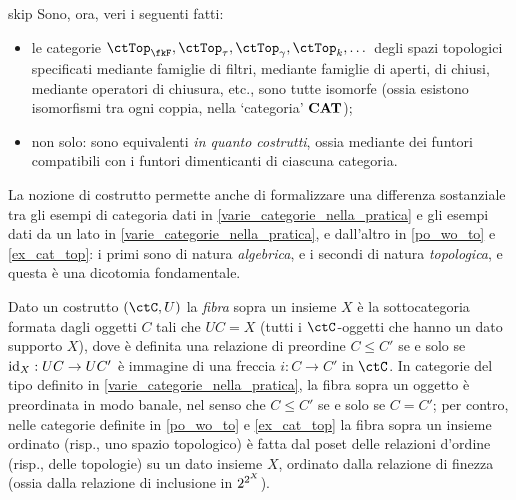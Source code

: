 \begin{hDigression}{skip}
	Sono, ora, veri i seguenti fatti:
	\begin{itemize}
		\item le categorie \(\ctTop_\fkF,\ctTop_\tau,\ctTop_\gamma,\ctTop_k,\dots\) degli spazi topologici specificati mediante famiglie di filtri, mediante famiglie di aperti, di chiusi, mediante operatori di chiusura, etc., sono tutte isomorfe (ossia esistono isomorfismi tra ogni coppia, nella `categoria' \(\mathbf{CAT}\));
		\item non solo: sono equivalenti \emph{in quanto costrutti}, ossia mediante dei funtori compatibili con i funtori dimenticanti di ciascuna categoria.
	\end{itemize}
	La nozione di costrutto permette anche di formalizzare una differenza sostanziale tra gli esempi di categoria dati in \ref{varie_categorie_nella_pratica} e gli esempi dati da un lato in \ref{varie_categorie_nella_pratica}, e dall'altro in \ref{po_wo_to} e \ref{ex_cat_top}: i primi sono di natura \emph{algebrica}, e i secondi di natura \emph{topologica}, e questa è una dicotomia fondamentale.

	Dato un costrutto \((\ctC,U)\) la \emph{fibra} sopra un insieme \(X\) è la sottocategoria formata dagli oggetti \(C\) tali che \(UC=X\) (tutti i \(\ctC\)-oggetti che hanno un dato supporto \(X\)), dove è definita una relazione di preordine \(C\le C'\) se e solo se \(\mathrm{id}_X : UC \to UC'\) è immagine di una freccia \(i : C\to C'\) in \(\ctC\). In categorie del tipo definito in \ref{varie_categorie_nella_pratica}, la fibra sopra un oggetto è preordinata in modo banale, nel senso che \(C\le C'\) se e solo se \(C=C'\); per contro, nelle categorie definite in \ref{po_wo_to} e \ref{ex_cat_top} la fibra sopra un insieme ordinato (risp., uno spazio topologico) è fatta dal poset delle relazioni d'ordine (risp., delle topologie) su un dato insieme \(X\), ordinato dalla relazione di finezza (ossia dalla relazione di inclusione in \(2^{2^{X}}\)).
\end{hDigression}
